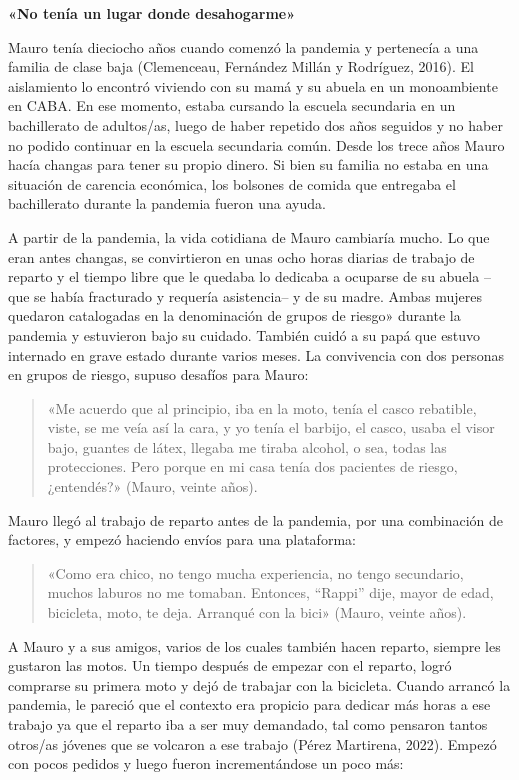 \textbf{«No tenía un lugar donde desahogarme»}

Mauro tenía dieciocho años cuando comenzó la pandemia y pertenecía a una familia de clase baja (Clemenceau, Fernández Millán y Rodríguez, 2016). El aislamiento lo encontró viviendo con su mamá y su abuela en un monoambiente en CABA. En ese momento, estaba cursando la escuela secundaria en un bachillerato de adultos/as, luego de haber repetido dos años seguidos y no haber no podido continuar en la escuela secundaria común. Desde los trece años Mauro hacía changas para tener su propio dinero. Si bien su familia no estaba en una situación de carencia económica, los bolsones de comida que entregaba el bachillerato durante la pandemia fueron una ayuda.

A partir de la pandemia, la vida cotidiana de Mauro cambiaría mucho. Lo que eran antes changas, se convirtieron en unas ocho horas diarias de trabajo de reparto y el tiempo libre que le quedaba lo dedicaba a ocuparse de su abuela --que se había fracturado y requería asistencia-- y de su madre. Ambas mujeres quedaron catalogadas en la denominación de grupos de riesgo» durante la pandemia y estuvieron bajo su cuidado. También cuidó a su papá que estuvo internado en grave estado durante varios meses. La convivencia con dos personas en grupos de riesgo, supuso desafíos para Mauro:

\begin{quote}
«Me acuerdo que al principio, iba en la moto, tenía el casco rebatible, viste, se me veía así la cara, y yo tenía el barbijo, el casco, usaba el visor bajo, guantes de látex, llegaba me tiraba alcohol, o sea, todas las protecciones. Pero porque en mi casa tenía dos pacientes de riesgo, ¿entendés?» (Mauro, veinte años).
\end{quote}

Mauro llegó al trabajo de reparto antes de la pandemia, por una combinación de factores, y empezó haciendo envíos para una plataforma:

\begin{quote}
«Como era chico, no tengo mucha experiencia, no tengo secundario, muchos laburos no me tomaban. Entonces, ``Rappi'' dije, mayor de edad, bicicleta, moto, te deja. Arranqué con la bici» (Mauro, veinte años).
\end{quote}

A Mauro y a sus amigos, varios de los cuales también hacen reparto, siempre les gustaron las motos. Un tiempo después de empezar con el reparto, logró comprarse su primera moto y dejó de trabajar con la bicicleta. Cuando arrancó la pandemia, le pareció que el contexto era propicio para dedicar más horas a ese trabajo ya que el reparto iba a ser muy demandado, tal como pensaron tantos otros/as jóvenes que se volcaron a ese trabajo (Pérez Martirena, 2022). Empezó con pocos pedidos y luego fueron incrementándose un poco más:

